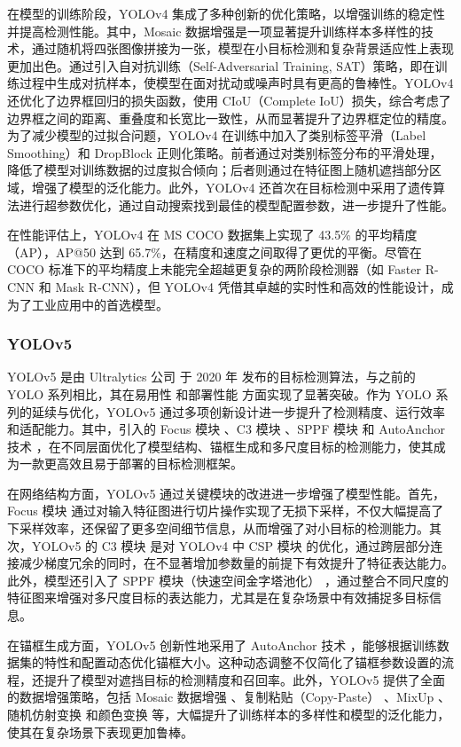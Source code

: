 \documentclass[11pt,twocolumn]{ctexart}
\begin{document}
在模型的训练阶段，YOLOv4 集成了多种创新的优化策略，以增强训练的稳定性并提高检测性能。其中，Mosaic 数据增强是一项显著提升训练样本多样性的技术，通过随机将四张图像拼接为一张，模型在小目标检测和复杂背景适应性上表现更加出色。通过引入自对抗训练（Self-Adversarial Training, SAT）策略，即在训练过程中生成对抗样本，使模型在面对扰动或噪声时具有更高的鲁棒性。YOLOv4 还优化了边界框回归的损失函数，使用 CIoU（Complete IoU）损失，综合考虑了边界框之间的距离、重叠度和长宽比一致性，从而显著提升了边界框定位的精度。为了减少模型的过拟合问题，YOLOv4 在训练中加入了类别标签平滑（Label Smoothing）和 DropBlock 正则化策略。前者通过对类别标签分布的平滑处理，降低了模型对训练数据的过度拟合倾向；后者则通过在特征图上随机遮挡部分区域，增强了模型的泛化能力。此外，YOLOv4 还首次在目标检测中采用了遗传算法进行超参数优化，通过自动搜索找到最佳的模型配置参数，进一步提升了性能。

在性能评估上，YOLOv4 在 MS COCO 数据集上实现了 43.5\% 的平均精度（AP），AP@50 达到 65.7\%，在精度和速度之间取得了更优的平衡。尽管在 COCO 标准下的平均精度上未能完全超越更复杂的两阶段检测器（如 Faster R-CNN 和 Mask R-CNN），但 YOLOv4 凭借其卓越的实时性和高效的性能设计，成为了工业应用中的首选模型。
\subsubsection{YOLOv5}
YOLOv5\cite{yolov5} 是由 Ultralytics 公司 于 2020 年 发布的目标检测算法，与之前的 YOLO 系列相比，其在易用性 和部署性能 方面实现了显著突破。作为 YOLO 系列的延续与优化，YOLOv5 通过多项创新设计进一步提升了检测精度、运行效率和适配能力。其中，引入的 Focus 模块 、C3 模块 、SPPF 模块 和 AutoAnchor 技术 ，在不同层面优化了模型结构、锚框生成和多尺度目标的检测能力，使其成为一款更高效且易于部署的目标检测框架。

在网络结构方面，YOLOv5 通过关键模块的改进进一步增强了模型性能。首先，Focus 模块 通过对输入特征图进行切片操作实现了无损下采样，不仅大幅提高了下采样效率，还保留了更多空间细节信息，从而增强了对小目标的检测能力。其次，YOLOv5 的 C3 模块 是对 YOLOv4 中 CSP 模块 的优化，通过跨层部分连接减少梯度冗余的同时，在不显著增加参数量的前提下有效提升了特征表达能力。此外，模型还引入了 SPPF 模块（快速空间金字塔池化） ，通过整合不同尺度的特征图来增强对多尺度目标的表达能力，尤其是在复杂场景中有效捕捉多目标信息。

在锚框生成方面，YOLOv5 创新性地采用了 AutoAnchor 技术 ，能够根据训练数据集的特性和配置动态优化锚框大小。这种动态调整不仅简化了锚框参数设置的流程，还提升了模型对遮挡目标的检测精度和召回率。此外，YOLOv5 提供了全面的数据增强策略，包括 Mosaic 数据增强 、复制粘贴（Copy-Paste） 、MixUp 、随机仿射变换 和颜色变换 等，大幅提升了训练样本的多样性和模型的泛化能力，使其在复杂场景下表现更加鲁棒。
\end{document}
